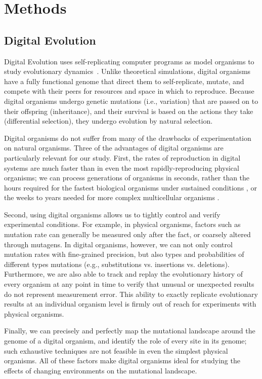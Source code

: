 \documentclass[10pt,letterpaper]{article}
\begin{document}
\section*{Methods}

\subsection*{Digital Evolution}
Digital Evolution uses self-replicating computer programs as model organisms to study evolutionary dynamics~\cite{mckinley_harnessing_2008}.
Unlike theoretical simulations, digital organisms have a fully functional genome that direct them to self-replicate, mutate, and compete with their peers for resources and space in which to reproduce. Because digital organisms undergo genetic mutations (i.e., variation) that are passed on to their offspring (inheritance), and their survival is based on the actions they take (differential selection), they undergo evolution by natural selection. %

Digital organisms do not suffer from many of the drawbacks of experimentation on natural organisms.  Three of the advantages of digital organisms are particularly relevant for our study.  First, the rates of reproduction in digital systems are much faster than in even the most rapidly-reproducing physical organisms; we can process generations of organisms in seconds, rather than the hours required for the fastest biological organisms under sustained conditions \cite{ryan_evolution_1953,lenski_long-term_1991}, or the weeks to years needed for more complex multicellular organisms \cite{anderson_outcrossing_2010,stearns_experimental_2000}.

Second, using digital organisms allows us to tightly control and verify experimental conditions. For example, in physical organisms, factors such as mutation rate can generally be measured only after the fact, or coarsely altered through mutagens. In digital organisms, however, we can not only control mutation rates with fine-grained precision, but also types and probabilities of different types mutations (e.g., substitutions vs. insertions vs. deletions). Furthermore, we are also able to track and replay the evolutionary history of every organism at any point in time to verify that unusual or unexpected results do not represent measurement error.  This ability to exactly replicate evolutionary results at an individual organism level is firmly out of reach for experiments with physical organisms.

Finally, we can precisely and perfectly map the mutational landscape around the genome of a digital organism, and identify the role of every site in its genome\cite{ofria_evolution_2002}; such exhaustive techniques are not feasible in even the simplest physical organisms.  All of these factors make digital organisms ideal for studying the effects of changing environments on the mutational landscape.
\end{document}
